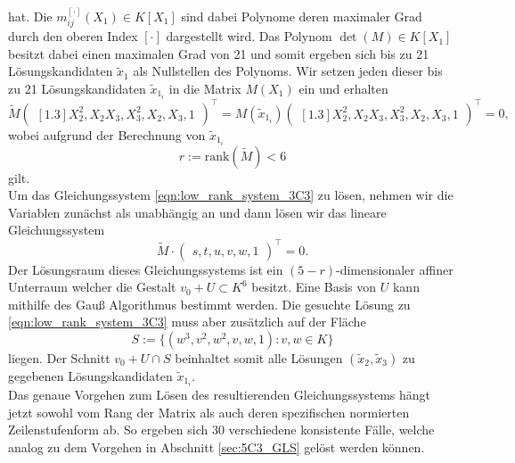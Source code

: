 \documentclass[a4paper,oneside, 11pt, openany%
]{article}
\newcommand{\coloneqq}{:=}
\theoremstyle{custom}
\theoremstyle{custom}
\begin{document}
	hat. Die $m_{ij}^{\left[\cdot \right] }\left(X_{1}\right) \in K\left[ X_{1}\right]$ sind dabei Polynome deren maximaler Grad durch den oberen Index $\left[\cdot \right]$ dargestellt wird.
	Das Polynom $\det(M) \in K[X_1]$ besitzt dabei einen maximalen Grad von 21 und somit ergeben sich bis zu 21 Lösungskandidaten $\tilde{x}_1$ als Nullstellen des Polynoms.
	Wir setzen jeden dieser bis zu 21 Lösungskandidaten $\tilde{x}_{1_{i}}$ in die Matrix $M(X_{1})$ ein und erhalten 
	\begin{equation}\label{eqn:low_rank_system_3C3}
		\tilde{M}\begin{pmatrix}[1.3]
			X_{2}^2,
			X_{2}X_{3},
			X_{3}^2,
			X_{2},
			X_{3},
			1
		\end{pmatrix}^{\top} = 	M(\tilde{x}_{1_{i}})\begin{pmatrix}[1.3]
			X_{2}^2,
			X_{2}X_{3},
			X_{3}^2,
			X_{2},
			X_{3},
			1
		\end{pmatrix}^{\top}=0,
	\end{equation}
	wobei aufgrund der Berechnung von $\tilde{x}_{1_{i}}$ 
	\begin{equation*}
		r \coloneqq \text{rank}(\tilde{M}) < 6
	\end{equation*} gilt.\\
	Um das Gleichungssystem \eqref{eqn:low_rank_system_3C3} zu lösen, nehmen wir die Variablen zunächst als unabhängig an und dann lösen wir das lineare Gleichungssystem
	\begin{equation}\label{eqn:low_rank_system_ind_3C3}
		\tilde{M} \cdot \begin{pmatrix}
			s,
			t,
			u,
			v,
			w,
			1
		\end{pmatrix}^{\top}
		=0.
	\end{equation}
	Der Lösungsraum dieses Gleichungssystems ist ein $(5-r)$-dimensionaler affiner Unterraum welcher die Gestalt ${v_0 + U \subset K^6}$ besitzt. Eine Basis von $U$ kann mithilfe des Gauß Algorithmus bestimmt werden. Die gesuchte Lösung zu \eqref{eqn:low_rank_system_3C3} muss aber zusätzlich auf der Fläche \begin{equation*}
		{S \coloneqq \{(w^3,v^2,w^2,v,w,1) : v,w \in K\}}
	\end{equation*} liegen. Der Schnitt $v_0 + U \cap S $ beinhaltet somit alle Lösungen $(\tilde{x}_{2},\tilde{x}_{3})$ zu gegebenen Lösungskandidaten $\tilde{x}_{1_{i}}$.\\
Das genaue Vorgehen zum Lösen des resultierenden Gleichungssystems hängt jetzt sowohl vom Rang der Matrix als auch deren spezifischen normierten Zeilenstufenform ab. So ergeben sich $30$ verschiedene konsistente Fälle, welche analog zu dem Vorgehen in Abschnitt \ref{sec:5C3_GLS} gelöst werden können.
	
\end{document}
